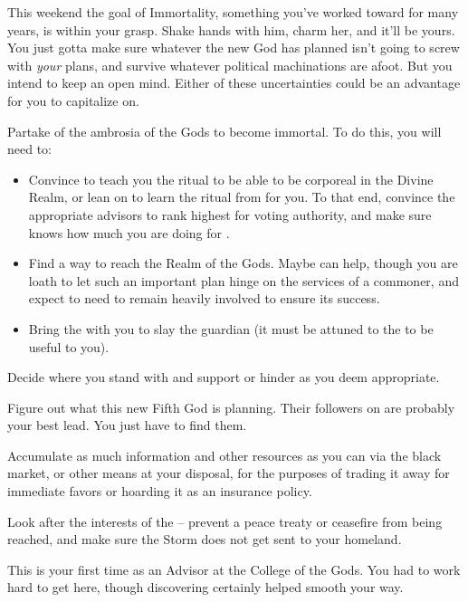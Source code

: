 \documentclass[char]{GL2020}
\begin{document}
This weekend the goal of Immortality, something you’ve worked toward for many years, is within your grasp. Shake hands with him, charm her, and it’ll be yours. You just gotta make sure whatever the new God has planned isn’t going to screw with \emph{your} plans, and survive whatever political machinations are afoot. But you intend to keep an open mind. Either of these uncertainties could be an advantage for you to capitalize on.


\begin{itemz}
	\item Partake of the ambrosia of the Gods to become immortal. To do this, you will need to:
	\begin{itemize}
		\item Convince \cDisney{} to teach you the ritual to be able to be corporeal in the Divine Realm, or lean on \cPirateChild{} to learn the ritual from \cDisney{\them} for you. To that end, convince the appropriate advisors to rank \cDisney{} highest for voting authority, and make sure \cDisney{} knows how much you are doing for \cDisney{\them}.
		\item Find a way to reach the Realm of the Gods. Maybe \cCurse{} can help, though you are loath to let such an important plan hinge on the services of a commoner, and expect to need to remain heavily involved to ensure its success.
		\item Bring the \iScythe{} with you to slay the guardian (it must be attuned to the \pFarm{} to be useful to you).
	\end{itemize}
	\item Decide where you stand with \cPrince{} and support or hinder \cPrince{\them} as you deem appropriate.
	\item Figure out what this new Fifth God is planning. Their followers on \pEarth{} are probably your best lead. You just have to find them.
	\item Accumulate as much information and other resources as you can via the black market, or other means at your disposal, for the purposes of trading it away for immediate favors or hoarding it as an insurance policy.
	\item Look after the interests of the \pFarm{} – prevent a peace treaty or ceasefire from being reached, and make sure the Storm does not get sent to your homeland.
\end{itemz}

\begin{itemz}[Notes]
	\item This is your first time as an Advisor at the College of the Gods. You had to work hard to get here, though discovering \cDisney{} certainly helped smooth your way.
\end{itemz}
\end{document}
